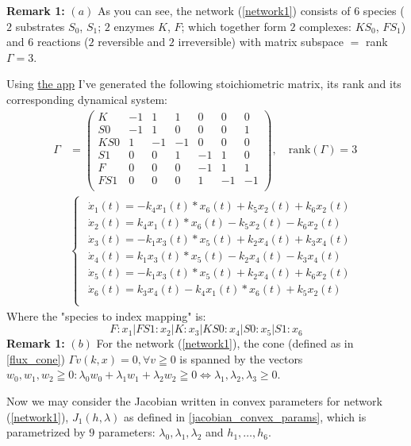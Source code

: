 \textbf{Remark 1:} $(a)$ As you can see, the network (\ref{network1}) consists of $6$ species ($2$ substrates $S_0$, $S_1$; $2$ enzymes $K$, $F$; which together form $2$ complexes: $K S_0$, $F S_1$) and $6$ reactions ($2$ reversible and $2$ irreversible) with matrix subspace $=$ rank $\Gamma = 3$.

Using \href{https://github.com/viktorashi/Open-CoNtRol}{the app} I've generated the following stoichiometric matrix, its rank and its corresponding dynamical system:
\begin{align*}
	\Gamma &=
	\begin{pmatrix}
		K & -1 &  1 &  1 &  0 &  0 &  0 \\
		S0& -1 &  1 &  0 &  0 &  0 &  1 \\
		KS0 &  1& -1& -1 &  0 &  0 &  0 \\
		S1 &  0 &  0 &  1& -1 &  1 &  0 \\
		F &  0 &  0 &  0& -1 &  1 &  1 \\
		FS1 &  0 &  0 &  0 &  1& -1& -1  \\		
	\end{pmatrix}, \quad \text{rank}(\Gamma) = 3 \\[3ex]
	&
	\begin{cases*}
		\begin{array}{ll}
			\dot{x}_1(t) = -k_4 x_1(t) *x_6(t)+k_5 x_2(t)+k_6 x_2(t) \\
			\dot{x}_2(t) = k_4 x_1(t) *x_6(t)-k_5 x_2(t)-k_6 x_2(t) \\
			\dot{x}_3(t) = -k_1 x_3(t) *x_5(t)+k_2 x_4(t)+k_3 x_4(t) \\
			\dot{x}_4(t) = k_1 x_3(t) *x_5(t)-k_2 x_4(t)-k_3 x_4(t) \\
			\dot{x}_5(t) = -k_1 x_3(t) *x_5(t)+k_2 x_4(t)+k_6 x_2(t) \\
			\dot{x}_6(t) = k_3 x_4(t)-k_4 x_1(t) *x_6(t)+k_5 x_2(t) \\
		\end{array}	
	\end{cases*}
\end{align*}
Where the "species to index mapping" is:
\[
	F:  x_1
 | FS1: x_2
 | K: x_3
 | KS0: x_4
 | S0: x_5
 | S1: x_6
\]
\textbf{Remark 1:} $(b)$ For the network (\ref{network1}), the cone (defined as in \ref{flux_cone}) $\Gamma v(k,x) = 0, \forall v \geqq 0$ is spanned by the vectors $w_0, w_1, w_2 \geqq 0 : \lambda_0 w_0 + \lambda_1 w_1 + \lambda_2 w_2 \geqq 0 \iff \lambda_1, \lambda_2, \lambda_3 \geq 0$.

Now we may consider the Jacobian written in convex parameters for network (\ref{network1}), $J_1(h,\lambda)$ as defined in \ref{jacobian_convex_params}, which is parametrized by $9$ parameters: $\lambda_0, \lambda_1, \lambda_2$ and $h_1, \ldots, h_6$.

